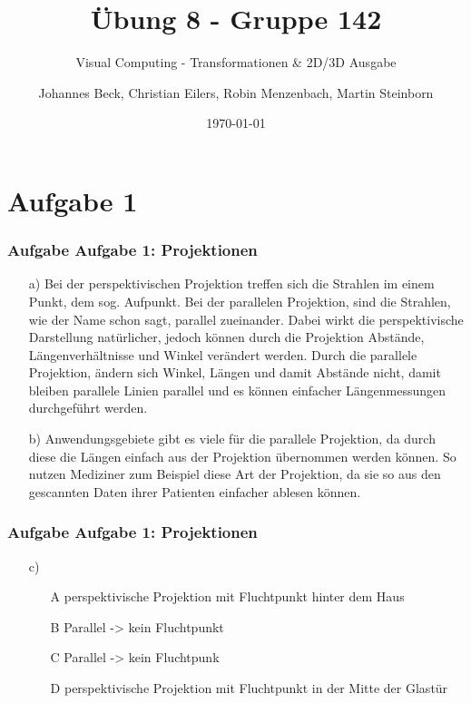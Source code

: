 \documentclass[accentcolor=tud9c,colorbacktitle,inverttitle,landscape,german,presentation,t]{tudbeamer}
\begin{document}
\title{\"Ubung 8 - Gruppe 142}
\subtitle{Visual Computing - Transformationen \& 2D/3D Ausgabe}

\author[Johannes Beck, Christian Eilers, Robin Menzenbach, Martin Steinborn]{Johannes Beck, Christian Eilers, Robin Menzenbach, Martin Steinborn}


\date{\today}

\begin{titleframe}
\end{titleframe}

\section{Aufgabe 1}
	\begin{frame}
		\frametitle{Aufgabe Aufgabe 1: Projektionen}
		\begin{itemize}
		\item[a)] Bei der perspektivischen Projektion treffen sich die Strahlen im einem Punkt, dem sog. Aufpunkt. Bei der parallelen Projektion, sind die Strahlen, wie der Name schon sagt, parallel zueinander. Dabei wirkt die perspektivische Darstellung natürlicher, jedoch können durch die Projektion Abstände, Längenverhältnisse und Winkel verändert werden. Durch die parallele Projektion, ändern sich Winkel, Längen und damit Abstände nicht, damit bleiben parallele Linien parallel und es können einfacher Längenmessungen durchgeführt werden.
		\item[b)] Anwendungsgebiete gibt es viele für die parallele Projektion, da durch diese die Längen einfach aus der Projektion übernommen werden können. So nutzen Mediziner zum Beispiel diese Art der Projektion, da sie so aus den gescannten Daten ihrer Patienten einfacher ablesen können.
		\end{itemize}
	\end{frame}

	\begin{frame}
		\frametitle{Aufgabe Aufgabe 1: Projektionen}
		\begin{itemize}
		\item[c)] 
		\begin{itemize}
			\item[A] perspektivische Projektion mit Fluchtpunkt hinter dem Haus
			\item[B] Parallel -> kein Fluchtpunkt
			\item[C] Parallel -> kein Fluchtpunk
			\item[D] perspektivische Projektion mit Fluchtpunkt in der Mitte der Glastür
		\end{itemize}
		\end{itemize}
	\end{frame}
\end{document}
